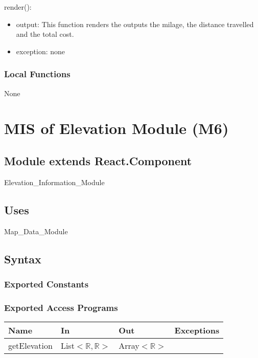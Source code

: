 \documentclass[12pt, titlepage]{article}
\begin{document}
\noindent render():
\begin{itemize}
\item output: This function renders the outputs the milage, the distance travelled and the total cost.
\item exception: none
\end{itemize}

\subsubsection{Local Functions}

None

\newpage



\section{MIS of Elevation Module (M6)} 

\label{Module} 

\subsection{Module extends React.Component}

Elevation\_Information\_Module

\subsection{Uses}

Map\_Data\_Module

\subsection{Syntax}

\subsubsection{Exported Constants}

\subsubsection{Exported Access Programs}

\begin{tabular}{| l | l | l | l |}
  \hline
  \textbf{Name} & \textbf{In} & \textbf{Out} & \textbf{Exceptions}\\
  \hline
  getElevation & List$<\mathbb{R},\mathbb{R}>$ & Array$<\mathbb{R}>$ & ~\\
  \hline
\end{tabular}
\end{document}
